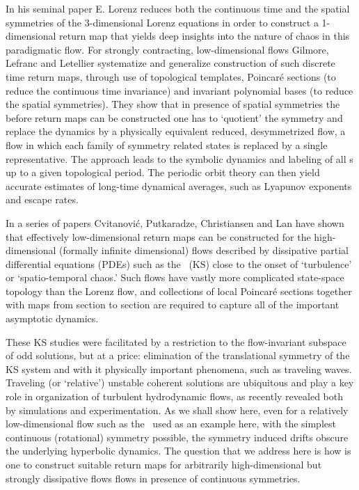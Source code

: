 %
In his seminal paper E. Lorenz reduces both the
continuous time and the spatial symmetries of the
3-dimensional Lorenz equations in order to construct a
1-dimensional return map that yields deep
insights into the nature of chaos in this
paradigmatic flow. For strongly contracting, low-dimensional
flows Gilmore, Lefranc and
Letellier systematize and
generalize construction of such discrete time return maps,
through use of topological templates, Poincar\'e sections (to
reduce the continuous time invariance) and invariant
polynomial bases (to reduce the spatial symmetries). They
show that in presence of spatial symmetries the before return
maps can be constructed one has to  `quotient' the symmetry
and replace the dynamics by a physically equivalent reduced,
desymmetrized flow, a flow in which each family of symmetry
related states is replaced by a single representative. The
approach leads to the symbolic dynamics and labeling of all \po
s up to a given topological period. The periodic orbit theory
can then yield accurate estimates of long-time dynamical
averages, such as Lyapunov exponents and escape
rates.

In a series of papers Cvitanovi\'{c}, Putkaradze,
Christiansen and Lan%
have shown that effectively low-dimensional return maps can
be constructed for the high-dimensional (formally infinite
dimensional)  flows described by dissipative partial differential
equations (PDEs) such as the \KSe\ (KS) close to the onset of
`turbulence' or `spatio-temporal chaos.' Such flows have
vastly more complicated state-space topology than the Lorenz
flow, and collections of local Poincar\'e sections together
with maps from section to section are required to capture all
of the important asymptotic dynamics.

These KS studies were facilitated by a restriction to the
flow-invariant subspace of odd solutions, but at a price:
elimination of the translational symmetry of the KS system
and with it physically important phenomena, such as traveling
waves. Traveling (or `relative') unstable coherent solutions
are ubiquitous and play a key role in organization of
turbulent hydrodynamic flows, as recently revealed both by
simulations and
experimentation. As we
shall show here, even for a relatively low-dimensional flow
such as the \cLe\ used as an example here, with the simplest
continuous (rotational) symmetry possible, the symmetry
induced drifts obscure the underlying hyperbolic dynamics.
The question that we address here is how is one to construct
suitable return maps for arbitrarily high-dimensional but
strongly dissipative flows flows in presence of continuous
symmetries.

